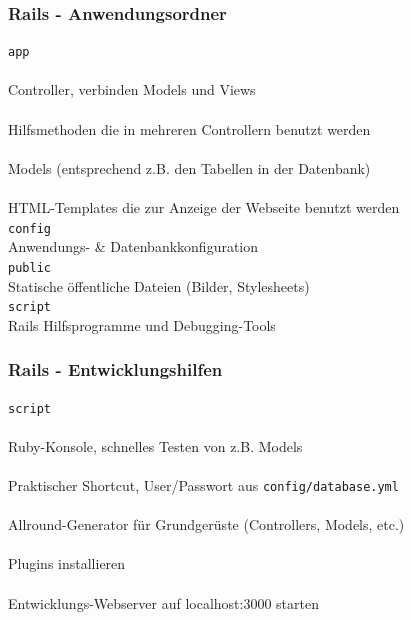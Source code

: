 \begin{frame}
  \frametitle{Rails - Anwendungsordner}
  \small
  {\tt app} \\
   \\ \enskip\enskip Controller, verbinden Models und Views \\
   \\ \enskip\enskip Hilfsmethoden die in mehreren Controllern benutzt werden \\
   \\ \enskip\enskip Models (entsprechend z.B. den Tabellen in der Datenbank) \\
   \\ \enskip\enskip HTML-Templates die zur Anzeige der Webseite benutzt werden \\
  {\tt config} \\ \enskip\enskip Anwendungs- \& Datenbankkonfiguration \\
  {\tt public} \\ \enskip\enskip Statische öffentliche Dateien (Bilder, Stylesheets) \\
  {\tt script} \\ \enskip\enskip Rails Hilfsprogramme und Debugging-Tools \\
\end{frame}

\begin{frame}
  \frametitle{Rails - Entwicklungshilfen}
  \small
  {\tt script} \\
   \\ \enskip\enskip Ruby-Konsole, schnelles Testen von z.B. Models\\
   \\ \enskip\enskip Praktischer Shortcut, User/Passwort aus {\tt config/database.yml} \\
   \\ \enskip\enskip Allround-Generator für Grundgerüste (Controllers, Models, etc.) \\
   \\ \enskip\enskip Plugins installieren \\
   \\ \enskip\enskip Entwicklungs-Webserver auf localhost:3000 starten
\end{frame}

